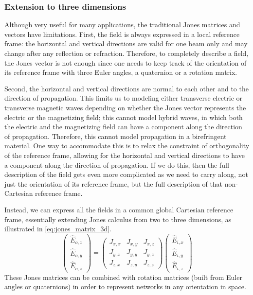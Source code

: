 \subsubsection{Extension to three dimensions}
Although very useful for many applications, the traditional Jones matrices and vectors have limitations.
First, the field is always expressed in a local reference frame: the horizontal and vertical directions are valid for one beam only and may change after any reflection or refraction.
Therefore, to completely describe a field, the Jones vector is not enough since one needs to keep track of the orientation of its reference frame with three Euler angles, a quaternion or a rotation matrix.

Second, the horizontal and vertical directions are normal to each other and to the direction of propagation.
This limits us to modeling either transverse electric or transverse magnetic waves depending on whether the Jones vector represents the electric or the magnetizing field;
this cannot model hybrid waves, in which both the electric and the magnetizing field can have a component along the direction of propagation.
Therefore, this cannot model propagation in a birefringent material.
One way to accommodate this is to relax the constraint of orthogonality of the reference frame, allowing for the horizontal and vertical directions to have a component along the direction of propagation.
If we do this, then the full description of the field gets even more complicated as we need to carry along, not just the orientation of its reference frame, but the full description of that non-Cartesian reference frame.

Instead, we can express all the fields in a common global Cartesian reference frame, essentially extending Jones calculus from two to three dimensions, as illustrated in \cref{eq:jones_matrix_3d}.
\begin{equation}
    \begin{pmatrix}
        \hat{E}_{o, x}\\
        \hat{E}_{o, y}\\
        \hat{E}_{o, z}
    \end{pmatrix}
    =
    \begin{pmatrix}
        J_{x, x}   &   J_{x, y}   &   J_{x, z} \\
        J_{y, x}   &   J_{y, y}   &   J_{y, z} \\
        J_{z, x}   &   J_{z, y}   &   J_{z, z}
    \end{pmatrix}
    \begin{pmatrix}
        \hat{E}_{i, x}\\
        \hat{E}_{i, y}\\
        \hat{E}_{i, z}
    \end{pmatrix}
    \label{eq:jones_matrix_3d}
\end{equation}
These Jones matrices can be combined with rotation matrices (built from Euler angles or quaternions) in order to represent networks in any orientation in space.

